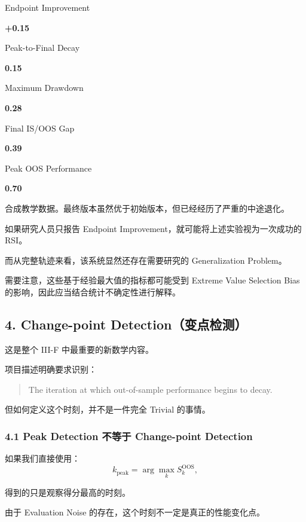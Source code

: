 Endpoint Improvement

\textbf{+0.15}

Peak-to-Final Decay

\textbf{0.15}

Maximum Drawdown

\textbf{0.28}

Final IS/OOS Gap

\textbf{0.39}

Peak OOS Performance

\textbf{0.70}

合成教学数据。最终版本虽然优于初始版本，但已经经历了严重的中途退化。

如果研究人员只报告 Endpoint Improvement，就可能将上述实验视为一次成功的 RSI。

而从完整轨迹来看，该系统显然还存在需要研究的 Generalization Problem。

需要注意，这些基于经验最大值的指标都可能受到 Extreme Value Selection Bias 的影响，因此应当结合统计不确定性进行解释。

\hypertarget{part-3-48-0001-change-point-detectionux53d8ux70b9ux68c0ux6d4b}{%
\subsection{4. Change-point Detection（变点检测）}\label{part-3-48-0001-change-point-detectionux53d8ux70b9ux68c0ux6d4b}}

这是整个 III-F 中最重要的新数学内容。

项目描述明确要求识别：

\begin{quote}
The iteration at which out-of-sample performance begins to decay.
\end{quote}

但如何定义这个时刻，并不是一件完全 Trivial 的事情。

\hypertarget{part-3-48-0001-peak-detection-ux4e0dux7b49ux4e8e-change-point-detection}{%
\subsubsection{4.1 Peak Detection 不等于 Change-point Detection}\label{part-3-48-0001-peak-detection-ux4e0dux7b49ux4e8e-change-point-detection}}

如果我们直接使用：
\[k_{\mathrm{peak}}
=
\arg\max_k S_k^{\mathrm{OOS}},\]

得到的只是观察得分最高的时刻。

由于 Evaluation Noise 的存在，这个时刻不一定是真正的性能变化点。

